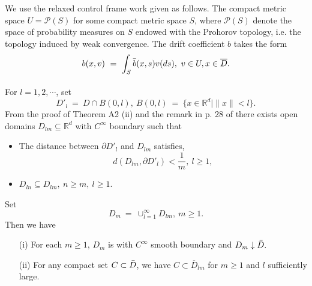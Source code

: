 \documentclass[11pt]{amsart}
\numberwithin{equation}{section}
\begin{document}
We use the relaxed control frame work given as follows. The compact metric space $U = {\mathcal P}(S)$
for some compact metric space $S$, where ${\mathcal P}(S)$ denote the space of probability measures
on $S$ endowed with the Prohorov topology, i.e. the topology induced by weak convergence. The drift
coefficient $b$ takes the form 
\[
b(x, v) \ = \ \int_{S} \Bar{b}(x, s) v(ds) , \ v \in U, x \in \overline{D}.
\]
 \paragraph{} 
For $l = 1, 2, \cdots $, set
\[
D'_l \ = \ D \cap B(0, l), \ B(0, l) \ = \ \{ x \in \mathbb{R}^d| \|x \| < l \}.
\]
From the proof of Theorem A2 (ii) and the remark in  p. 28 of \cite{Chung} 
there exists open domains $D_{lm} \subseteq \mathbb{R}^d$  with $C^\infty$ boundary such that 
\begin{itemize}
\item The distance between $\partial D'_l$ and $D_{lm}$ satisfies, 
$$d ( D_{lm} , \partial D'_l) < \frac{1}{m}, \ l \geq 1,$$
\item $D_{ln} \subseteq D_{lm}, \ n \geq m , \ l \geq 1$.
\end{itemize}
Set  $$ D_m \ = \ \cup^\infty_{l =1} D_{lm},  \ m \geq 1.$$ Then we have 

\begin{itemize}
 \item[(i)]  For each $m \geq 1$, $D_m$ is with $C^\infty$ smooth boundary and 
$D_m \downarrow \Bar{D}.$
\item[(ii)] For any compact set $C\subset \Bar{D}$, we have $C\subset \overline{D}_{lm}$ for $m \geq 1$ 
and $l$ sufficiently large. 
\end{itemize}
 
\end{document}
